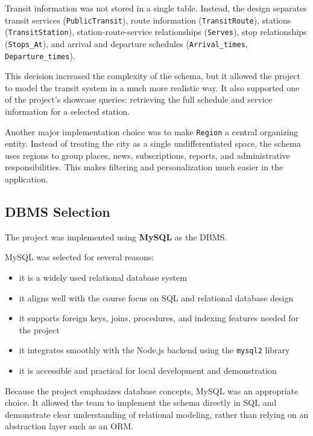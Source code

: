Transit information was not stored in a single table. Instead, the design separates transit services (\texttt{PublicTransit}), route information (\texttt{TransitRoute}), stations (\texttt{TransitStation}), station-route-service relationships (\texttt{Serves}), stop relationships (\texttt{Stops\_At}), and arrival and departure schedules (\texttt{Arrival\_times}, \texttt{Departure\_times}).

This decision increased the complexity of the schema, but it allowed the project to model the transit system in a much more realistic way. It also supported one of the project's showcase queries: retrieving the full schedule and service information for a selected station.


Another major implementation choice was to make \texttt{Region} a central organizing entity. Instead of treating the city as a single undifferentiated space, the schema uses regions to group places, news, subscriptions, reports, and administrative responsibilities. This makes filtering and personalization much easier in the application.

\subsection{DBMS Selection}

The project was implemented using \textbf{MySQL} as the DBMS.

MySQL was selected for several reasons:
\begin{itemize}
    \item it is a widely used relational database system
    \item it aligns well with the course focus on SQL and relational database design
    \item it supports foreign keys, joins, procedures, and indexing features needed for the project
    \item it integrates smoothly with the Node.js backend using the \texttt{mysql2} library
    \item it is accessible and practical for local development and demonstration
\end{itemize}

Because the project emphasizes database concepts, MySQL was an appropriate choice. It allowed the team to implement the schema directly in SQL and demonstrate clear understanding of relational modeling, rather than relying on an abstraction layer such as an ORM.

